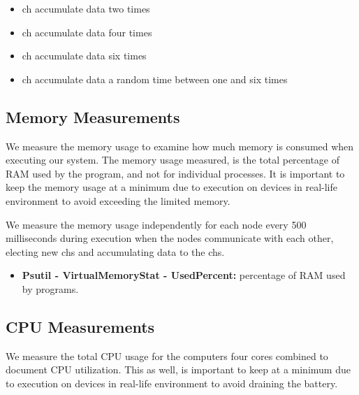 \documentclass[USenglish]{uit-thesis}
\begin{document}
\begin{itemize}
\item \gls{ch} accumulate data two times
\item \gls{ch} accumulate data four times
\item \gls{ch} accumulate data six times
\item \gls{ch} accumulate data a random time between one and six times
\end{itemize}



\subsection{Memory Measurements} \label{eva:mem_measure}
We measure the memory usage to examine how much memory is consumed when executing our system. The memory usage measured, is the total percentage of RAM used by the program, and not for individual processes. It is important to keep the memory usage at a minimum due to execution on devices in real-life environment to avoid exceeding the limited memory.


We measure the memory usage independently for each node every 500 milliseconds during execution when the nodes communicate with each other, electing new \glspl{ch} and accumulating data to the \glspl{ch}.

\begin{itemize}
\item \textbf{Psutil - VirtualMemoryStat - UsedPercent:} percentage of RAM used by programs.
\end{itemize}


\subsection{CPU Measurements} \label{eva:cpu_measure}
We measure the total CPU usage for the computers four cores combined to document CPU utilization. This as well, is important to keep at a minimum due to execution on devices in real-life environment to avoid draining the battery.
\end{document}
